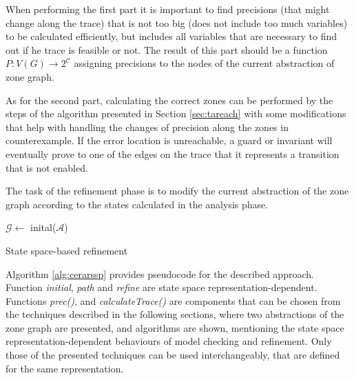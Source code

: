 \begin{runningExample}
When performing the first part it is important to find precisions (that might change along the trace) that is not too big (does not include too much variables) to be calculated efficiently, but includes all variables that are necessary to find out if he trace is feasible or not. The result of this part should be a function $P: V(G) \to 2^\mathcal{C}$ assigning precisions to the nodes of the current abstraction of zone graph.

As for the second part, calculating the correct zones can be performed by the steps of the algorithm presented in Section \ref{sec:tareach} with some modifications that help with handling the changes of precision along the zones in counterexample. If the error location is unreachable, a guard or invariant will eventually prove to one of the edges on the trace that it represents a transition that is not enabled.

The task of the refinement phase is to modify the current abstraction of the zone graph according to the states calculated in the analysis phase.

\begin{algorithm}
	\BlankLine
	$\mathcal{G} \leftarrow$ inital($\mathcal{A}$) 
	\caption{State space-based refinement} \label{alg:cerarssp}
\end{algorithm}

Algorithm \ref{alg:cerarssp} provides pseudocode for the described approach. Function \emph{initial}, \emph{path} and \emph{refine} are state space representation-dependent. Functions \emph{prec()},  and \emph{calculateTrace()} are components that can be chosen from the techniques described in the following sections, where two abstractions of the zone graph are presented, and algorithms are shown, mentioning the state space representation-dependent behaviours of model checking and refinement. Only those of the presented techniques can be used interchangeably, that are defined for the same representation.



\end{runningExample}
